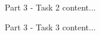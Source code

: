 \documentclass{beamer}					%
\begin{document}
\begin{frame}{Part 3  - Task 2}
	content...
\end{frame}


\begin{frame}{Part 3  - Task 3}
	content...
\end{frame}


%
%        
%
%
%	
%
%
%
%	
\end{document}

